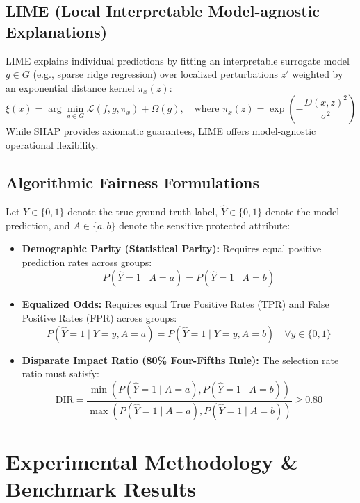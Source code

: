 \documentclass[11pt, a4paper]{article}
\begin{document}
\subsection{LIME (Local Interpretable Model-agnostic Explanations)}
LIME explains individual predictions by fitting an interpretable surrogate model $g \in G$ (e.g., sparse ridge regression) over localized perturbations $z'$ weighted by an exponential distance kernel $\pi_x(z)$:
\begin{equation}
\xi(x) = \arg\min_{g \in G} \mathcal{L}(f, g, \pi_x) + \Omega(g), \quad \text{where } \pi_x(z) = \exp\left(-\frac{D(x,z)^2}{\sigma^2}\right)
\end{equation}
While SHAP provides axiomatic guarantees, LIME offers model-agnostic operational flexibility.

\subsection{Algorithmic Fairness Formulations}
Let $Y \in \{0, 1\}$ denote the true ground truth label, $\hat{Y} \in \{0, 1\}$ denote the model prediction, and $A \in \{a, b\}$ denote the sensitive protected attribute:
\begin{itemize}[leftmargin=1.5em]
    \item \textbf{Demographic Parity (Statistical Parity):} Requires equal positive prediction rates across groups:
    \begin{equation}
    P(\hat{Y}=1 \mid A=a) = P(\hat{Y}=1 \mid A=b)
    \end{equation}
    \item \textbf{Equalized Odds:} Requires equal True Positive Rates (TPR) and False Positive Rates (FPR) across groups:
    \begin{equation}
    P(\hat{Y}=1 \mid Y=y, A=a) = P(\hat{Y}=1 \mid Y=y, A=b) \quad \forall y \in \{0, 1\}
    \end{equation}
    \item \textbf{Disparate Impact Ratio (80\% Four-Fifths Rule):} The selection rate ratio must satisfy:
    \begin{equation}
    \text{DIR} = \frac{\min(P(\hat{Y}=1 \mid A=a), P(\hat{Y}=1 \mid A=b))}{\max(P(\hat{Y}=1 \mid A=a), P(\hat{Y}=1 \mid A=b))} \ge 0.80
    \end{equation}
\end{itemize}

\section{Experimental Methodology \& Benchmark Results}
\end{document}
